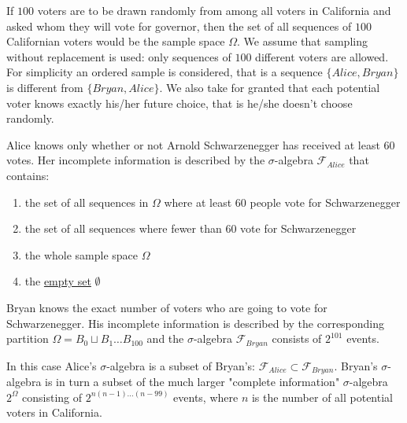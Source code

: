   \begin{example}[Voters]
    \label{ex:voters}
    If $100$ voters are to be drawn randomly from among all voters in California and asked whom they will vote for governor, then the set of all sequences of $100$ Californian voters would be the sample space $\Omega$. We assume that sampling without replacement is used: only sequences of $100$ different voters are allowed. For simplicity an ordered sample is considered, that is a sequence $\{Alice, Bryan\}$ is different from $\{Bryan, Alice\}$. We also take for granted that each potential voter knows exactly his/her future choice, that is he/she doesn't choose randomly.

    Alice knows only whether or not Arnold Schwarzenegger has received at least $60$ votes. Her incomplete information is described by the $\sigma$-algebra $\mathcal{F}_{Alice}$ that contains:
    \begin{enumerate}
      \item the set of all sequences in $\Omega$ where at least $60$ people vote for Schwarzenegger
      \item the set of all sequences where fewer than $60$ vote for Schwarzenegger
      \item the whole sample space $\Omega$
      \item the \hyperref[st-def:empty-set]{empty set} $\emptyset$
    \end{enumerate}
    Bryan knows the exact number of voters who are going to vote for Schwarzenegger. His incomplete information is described by the corresponding partition $\Omega = B_0 \sqcup B_1 \ldots B_{100}$ and the $\sigma$-algebra $\mathcal{F}_{Bryan}$ consists of $2^{101}$ events. 

    In this case Alice's $\sigma$-algebra is a subset of Bryan's: $\mathcal{F}_{Alice} \subset \mathcal{F}_{Bryan}$. Bryan's $\sigma$-algebra is in turn a subset of the much larger "complete information" $\sigma$-algebra $2^{\Omega}$ consisting of $2^{n(n-1)\ldots (n-99)}$ events, where $n$ is the number of all potential voters in California. 
  \end{example}

